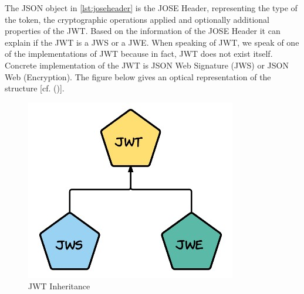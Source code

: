 {The JSON object in \ref{lst:joseheader} is the JOSE Header, representing the type of the token, the cryptographic operations applied and optionally additional properties of the JWT. Based on the information of the JOSE Header it can explain if the JWT is a JWS or a JWE. When speaking of JWT, we speak of one of the implementations of JWT because in fact, JWT does not exist itself. Concrete implementation of the JWT is JSON Web Signature (JWS) or JSON Web (Encryption). The figure below gives an optical representation of the structure [cf. (\cite{Siriwardena:JWTJWSJWE:2016})].


\begin{figure}[h]
	\centering
	\includegraphics[width=0.6\linewidth]{images/jwtjwsjwe}
	\caption[JWT Inheritence]{JWT Inheritance}
	\label{fig:jwtjwsjwe}
\end{figure}

}
